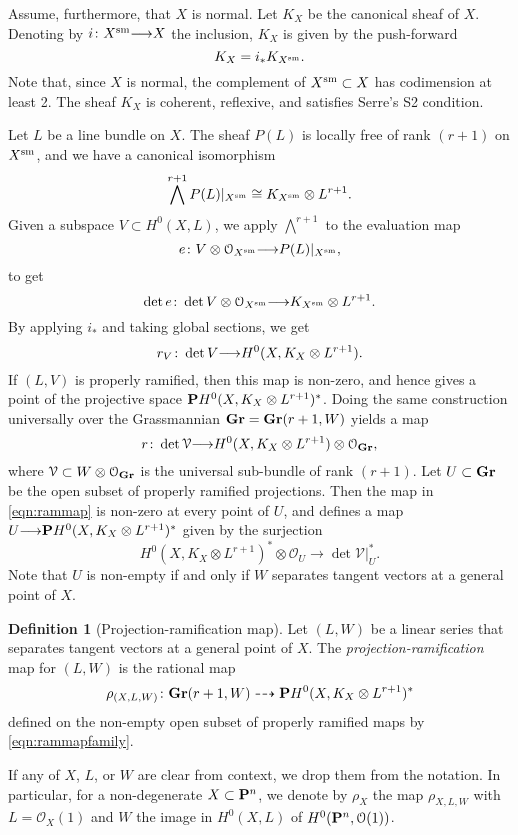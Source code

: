 \documentclass[11pt,reqno]{amsart}
\theoremstyle{plain}
\theoremstyle{definition}
\newtheorem{definition}[theorem]{Definition}
\theoremstyle{remark}
\numberwithin{equation}{section}
\renewcommand{\to}{{\longrightarrow}}
\numberwithin{equation}{section}
\renewcommand{\O}{\mathcal O}
\begin{document}
Assume, furthermore, that $X$ is normal.
Let $K_X$ be the canonical sheaf of $X$.
Denoting by $i \from X^{\rm sm} \to X$ the inclusion, $K_X$ is given by the push-forward
\[ K_X = i_* K_{X^{\rm sm}}.\]
Note that, since $X$ is normal, the complement of $X^{\rm sm} \subset X$ has codimension at least 2.
The sheaf $K_X$ is coherent, reflexive, and satisfies Serre's S2 condition.

Let $L$ be a line bundle on $X$.
The sheaf $P(L)$ is locally free of rank $(r+1)$ on $X^{\rm sm}$, and we have a canonical isomorphism
\[ \bigwedge^{r+1} P(L) |_{X^{\rm sm}} \cong K_{X^{\rm sm}} \otimes L^{r+1}.\]
Given a subspace $V \subset H^0(X, L)$, we apply $\bigwedge^{r+1}$ to the evaluation map
\[ e \from V \otimes \O_{X^{\rm sm}} \to P(L)|_{X^{\rm sm}},\]
to get
\[ \det e \from \det V \otimes \O_{X^{\rm sm}} \to K_{X^{\rm sm}} \otimes L^{r+1}. \]
By applying $i_*$ and taking global sections, we get
\begin{equation}\label{eqn:ramsection}
  r_V \from \det V \to H^0(X, K_X \otimes L^{r+1}).
\end{equation}
If $(L, V)$ is properly ramified, then this map is non-zero, and hence gives a point of the projective space $\P H^0(X, K_X \otimes L^{r+1})^*$.
Doing the same construction universally over the Grassmannian $\Gr = \Gr(r+1, W)$ yields a map
\begin{equation}\label{eqn:rammap}
  r \from \det \mathcal V \to H^0(X, K_X \otimes L^{r+1}) \otimes \O_{\Gr},
\end{equation}
where $\mathcal V \subset W \otimes \O_{\Gr}$ is the universal sub-bundle of rank $(r+1)$.
Let $U \subset \Gr$ be the open subset of properly ramified projections.
Then the map in \eqref{eqn:rammap} is non-zero at every point of $U$, and defines a map $U \to \P H^0(X, K_X \otimes L^{r+1})^*$ given by the surjection
\begin{equation}\label{eqn:rammapfamily}
  H^0(X, K_X \otimes L^{r+1})^* \otimes \O_{U} \to \det \mathcal V|_U^*.
\end{equation}
Note that $U$ is non-empty if and only if $W$ separates tangent vectors at a general point of $X$.
\begin{definition}[Projection-ramification map]
  \label{def:ProjectionRamification}
  Let $(L, W)$ be a linear series that separates tangent vectors at a general point of $X$.
  The \emph{projection-ramification} map for $(L,W)$ is the rational map
  \[
    \rho_{(X,L,W)} \from \Gr(r+1, W) \dashrightarrow \P H^0(X, K_X \otimes L^{r+1})^*
  \]
  defined on the non-empty open subset of properly ramified maps by \eqref{eqn:rammapfamily}.
\end{definition}
If any of $X$, $L$, or $W$ are clear from context, we drop them from the notation.
In particular, for a non-degenerate $X \subset \P^n$, we denote by $\rho_X$ the map $\rho_{X,L,W}$  with $L = \O_X(1)$ and $W$ the image in $H^0(X, L)$ of $H^0(\P^n, \O(1))$.
\end{document}
